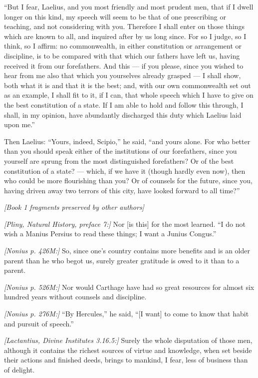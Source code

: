  ``But I fear, Laelius, and you most friendly and most prudent men, that if I dwell longer on this kind, my speech will seem to be that of one prescribing or teaching, and not considering with you. Therefore I shall enter on those things which are known to all, and inquired after by us long since. For so I judge, so I think, so I affirm: no commonwealth, in either constitution or arrangement or discipline, is to be compared with that which our fathers have left us, having received it from our forefathers. And this --- if you please, since you wished to hear from me also that which you yourselves already grasped --- I shall show, both what it is and that it is the best; and, with our own commonwealth set out as an example, I shall fit to it, if I can, that whole speech which I have to give on the best constitution of a state. If I am able to hold and follow this through, I shall, in my opinion, have abundantly discharged this duty which Laelius laid upon me.''

 Then Laelius: ``Yours, indeed, Scipio,'' he said, ``and yours alone. For who better than you should speak either of the institutions of our forefathers, since you yourself are sprung from the most distinguished forefathers? Or of the best constitution of a state? --- which, if we have it (though hardly even now), then who could be more flourishing than you? Or of counsels for the future, since you, having driven away two terrors of this city, have looked forward to all time?''

\bigskip
\noindent\textit{[Book 1 fragments preserved by other authors]}

 \textit{[Pliny, Natural History, preface 7:]} Nor [is this] for the most learned. ``I do not wish a Manius Persius to read these things; I want a Junius Congus.''

 \textit{[Nonius p. 426M:]} So, since one's country contains more benefits and is an older parent than he who begot us, surely greater gratitude is owed to it than to a parent.

 \textit{[Nonius p. 526M:]} Nor would Carthage have had so great resources for almost six hundred years without counsels and discipline.

 \textit{[Nonius p. 276M:]} ``By Hercules,'' he said, ``[I want] to come to know that habit and pursuit of speech.''

 \textit{[Lactantius, Divine Institutes 3.16.5:]} Surely the whole disputation of those men, although it contains the richest sources of virtue and knowledge, when set beside their actions and finished deeds, brings to mankind, I fear, less of business than of delight.


